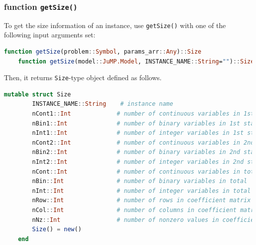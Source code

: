 \documentclass{hitec}
\begin{document}
	\subsubsection{function \texttt{getSize()}}
	To get the size information of an instance, use \texttt{getSize()} with one of the following input arguments set:
	\begin{lstlisting}[frame=single,language=julia]
	function getSize(problem::Symbol, params_arr::Any)::Size
	function getSize(model::JuMP.Model, INSTANCE_NAME::String="")::Size
	\end{lstlisting}
	Then, it returns \texttt{Size}-type object defined as follows.
	\begin{lstlisting}[frame=single,language=julia]
	mutable struct Size
		INSTANCE_NAME::String    # instance name
		nCont1::Int             # number of continuous variables in 1st stage
		nBin1::Int              # number of binary variables in 1st stage
		nInt1::Int              # number of integer variables in 1st stage
		nCont2::Int             # number of continuous variables in 2nd stage    
		nBin2::Int              # number of binary variables in 2nd stage
		nInt2::Int              # number of integer variables in 2nd stage    
		nCont::Int              # number of continuous variables in total      
		nBin::Int               # number of binary variables in total      
		nInt::Int               # number of integer variables in total      
		nRow::Int               # number of rows in coefficient matrix in extensive form
		nCol::Int               # number of columns in coefficient matrix in extensive form
		nNz::Int                # number of nonzero values in coefficient matrix in extensive form
		Size() = new()
	end
	\end{lstlisting}
	
\end{document}
